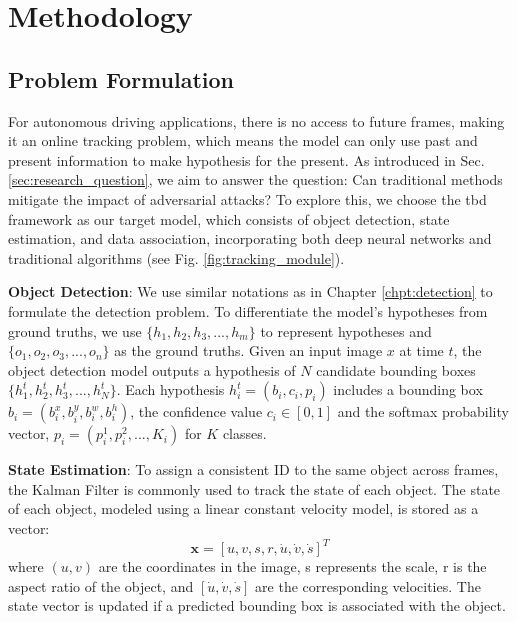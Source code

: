 \clearpage

\section{Methodology}

\subsection{Problem Formulation}

For autonomous driving applications, there is no access to future frames, making it an online tracking problem, which means the model can only use past and present information to make hypothesis for the present. As introduced in Sec. \ref{sec:research_question}, we aim to answer the question: Can traditional methods mitigate the impact of adversarial attacks? To explore this, we choose the \acrshort{tbd} framework as our target model, which consists of object detection, state estimation, and data association, incorporating both deep neural networks and traditional algorithms (see Fig. \ref{fig:tracking_module}).

\vspace{0.2cm}

\noindent\textbf{Object Detection}: We use similar notations as in Chapter \ref{chpt:detection} to formulate the detection problem. To differentiate the model's hypotheses from ground truths, we use $\{h_1, h_2, h_3, ..., h_m\}$ to represent hypotheses and $\{o_1, o_2, o_3, ..., o_n\}$ as the ground truths. Given an input image $x$ at time $t$, the object detection model outputs a hypothesis of $N$ candidate bounding boxes $\{h_1^t, h_2^t, h_3^t, ..., h_N^t\}$. Each hypothesis $h_i^t=(b_i, c_i, p_i)$ includes a bounding box $b_i=(b^x_i, b^y_i, b^w_i, b^h_i)$, the confidence value $c_i \in [0, 1]$ and the softmax probability vector, $p_i=(p^1_i, p^2_i, ..., K_i)$ for $K$ classes.

\vspace{0.2cm}

\noindent\textbf{State Estimation}: To assign a consistent ID to the same object across frames, the Kalman Filter is commonly used to track the state of each object. The state of each object, modeled using a linear constant velocity model, is stored as a vector:
\begin{equation}
    \bm{x} = [u, v, s, r, \dot{u}, \dot{v}, \dot{s}]^T
\end{equation}
where $(u, v)$ are the coordinates in the image, s represents the scale, r is the aspect ratio of the object, and $[\dot{u}, \dot{v}, \dot{s}]$ are the corresponding velocities. The state vector is updated if a predicted bounding box is associated with the object.

